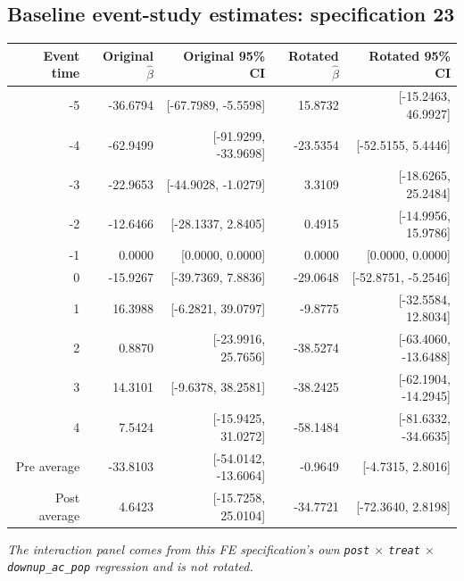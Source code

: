 \documentclass[10pt]{article}
\begin{document}
\subsection*{Baseline event-study estimates: specification 23}
\begin{center}
\scriptsize
\begin{tabular}{r rr rr}
\toprule
Event time & Original $\hat\beta$ & Original 95\% CI & Rotated $\hat\beta$ & Rotated 95\% CI \\
\midrule
-5 & -36.6794 & [-67.7989, -5.5598] & 15.8732 & [-15.2463, 46.9927] \\
-4 & -62.9499 & [-91.9299, -33.9698] & -23.5354 & [-52.5155, 5.4446] \\
-3 & -22.9653 & [-44.9028, -1.0279] & 3.3109 & [-18.6265, 25.2484] \\
-2 & -12.6466 & [-28.1337, 2.8405] & 0.4915 & [-14.9956, 15.9786] \\
-1 & 0.0000 & [0.0000, 0.0000] & 0.0000 & [0.0000, 0.0000] \\
0 & -15.9267 & [-39.7369, 7.8836] & -29.0648 & [-52.8751, -5.2546] \\
1 & 16.3988 & [-6.2821, 39.0797] & -9.8775 & [-32.5584, 12.8034] \\
2 & 0.8870 & [-23.9916, 25.7656] & -38.5274 & [-63.4060, -13.6488] \\
3 & 14.3101 & [-9.6378, 38.2581] & -38.2425 & [-62.1904, -14.2945] \\
4 & 7.5424 & [-15.9425, 31.0272] & -58.1484 & [-81.6332, -34.6635] \\
\midrule
Pre average & -33.8103 & [-54.0142, -13.6064] & -0.9649 & [-4.7315, 2.8016] \\
Post average & 4.6423 & [-15.7258, 25.0104] & -34.7721 & [-72.3640, 2.8198] \\
\bottomrule
\end{tabular}
\end{center}
\medskip
\textit{The interaction panel comes from this FE specification's own \texttt{post} $\times$ \texttt{treat} $\times$ \texttt{downup\_ac\_pop} regression and is not rotated.}
\clearpage
\end{document}
